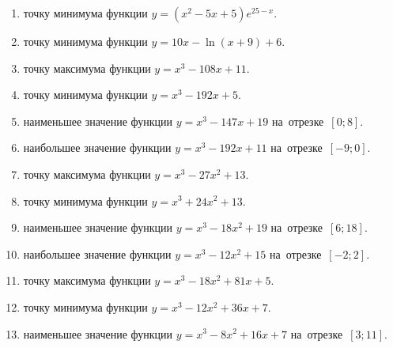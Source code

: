 \documentclass[a4paper,10pt]{article}
\begin{document}
\begin{enumerate}
\item {} точку минимума функции $y=\left(x^2-5x+5\right){{e}^{25-x}}$.

\item {} точку минимума функции $y=10x-\ln \left(x+9\right)+6$.

\item {} точку максимума функции $y=x^3 -108x +11$.







\item {} точку минимума функции $y=x^3 -192x+5$.







\item {} наименьшее значение функции $y=x^3 -147x+19$ на~отрезке~$\left[0;8\right]$.







\item {} наибольшее значение функции $y=x^3 -192x+11$ на~отрезке~$\left[-9;0\right]$.







\item {} точку максимума функции $y=x^3 -27x^2+13$.

\item {} точку минимума функции $y=x^3 +24x^2+13$.

\item {} наименьшее значение функции $y=x^3 -18x^2+19$ на~отрезке~$\left[6;18\right]$.

\item {} наибольшее значение функции $y=x^3 -12x^2+15$ на~отрезке~$\left[-2;2\right]$.

\item {} точку максимума функции $y=x^3 -18x^2+81x+5$.

\item {} точку минимума функции $y=x^3 -12x^2+36x+7$.

\item {} наименьшее значение функции $y=x^3 -8x^2+16x+7$ на~отрезке~$\left[3;11\right]$.


\end{enumerate}
\end{document}

